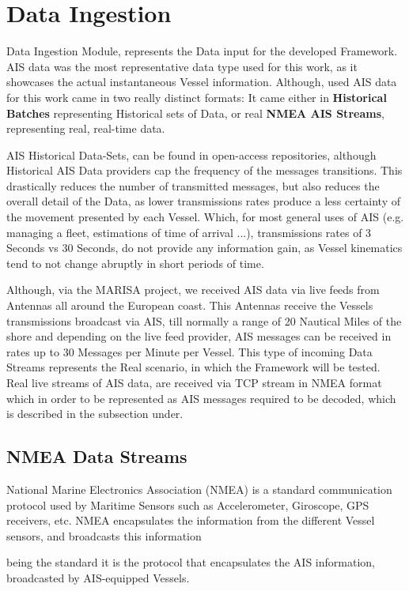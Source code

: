 \section{Data Ingestion}
Data Ingestion Module, represents the Data input for the developed Framework. AIS data was the most representative data type used for this work, as it showcases the actual instantaneous Vessel information.
Although, used AIS data for this work came in two really distinct formats: It came either in \textbf{Historical Batches} representing Historical sets of Data, or real \textbf{NMEA AIS Streams}, representing real, real-time 
data.

AIS Historical Data-Sets, can be found in open-access repositories, although Historical AIS Data providers cap the frequency of the messages transitions. This drastically reduces the number of transmitted messages, but also reduces the overall detail of the Data, as lower transmissions rates produce a less certainty of the movement presented by each Vessel. Which, for most general uses of AIS (e.g. managing a fleet, estimations of time of arrival ...), transmissions rates of 3 Seconds vs 30 Seconds, do not provide any information gain, as Vessel kinematics tend to not change abruptly in short periods of time. 

Although, via the MARISA project, we received AIS data via live feeds from Antennas all around the European coast. This Antennas receive the Vessels transmissions broadcast via AIS, till normally a range of 20 Nautical Miles of the shore and depending on the live feed provider, AIS messages can be received in rates up to 30 Messages per Minute per Vessel. This type of incoming Data Streams represents the Real scenario, in which the Framework will be tested. Real live streams of AIS data, are received via TCP stream in NMEA format which in order to be represented as AIS messages required to be decoded, which is described in the subsection under.


\subsection{NMEA Data Streams}
National Marine Electronics Association (NMEA) is a standard communication protocol used by Maritime Sensors such as Accelerometer, Giroscope, GPS receivers, etc.
NMEA encapsulates the information from the different Vessel sensors, and broadcasts this information

being the standard it is the protocol that encapsulates the AIS information, broadcasted by AIS-equipped Vessels. 

